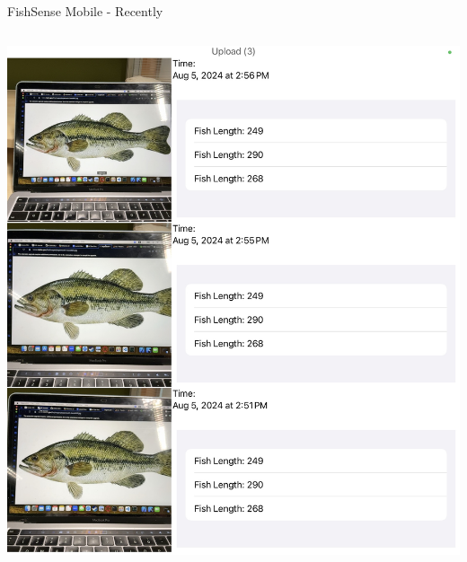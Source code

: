 \begin{frame}{FishSense Mobile - Recently}
\begin{columns}
\begin{column}{0.3\textwidth}
            \includegraphics[height=1.3\textheight,width=1.3\textwidth,keepaspectratio]{images/FailedImageGallery.png}
        \end{column}
    \end{columns}
\end{frame}